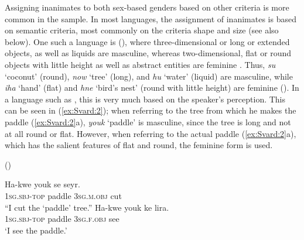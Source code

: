 \documentclass[output=collectionpaper]{langsci/langscibook}
\begin{document}
Assigning inanimates to both sex-based genders based on other criteria is more common in the sample. In most languages, the assignment of inanimates is based on semantic criteria, most commonly on the criteria shape and size (see also  below). One such a language is  (), where three-dimensional or long or extended objects, as well as liquids are masculine, whereas two-dimensional, flat or round objects with little height as well as abstract entities are feminine \citep[47]{Lock2011}. Thus, \textit{su} `coconut' (round), \textit{now} `tree' (long), and \textit{hu} `water' (liquid) are masculine, while \textit{iha} `hand' (flat) and \textit{hne} `bird's nest' (round with little height) are feminine (\citealt[48--50]{Lock2011}). In a language such as , this is very much based on the speaker's perception. This can be seen in (\ref{ex:Svard:2}); when referring to the tree from which he makes the paddle (\ref{ex:Svard:2}a), \textit{youk} `paddle' is masculine, since the tree is long and not at all round or flat. However, when referring to the actual paddle (\ref{ex:Svard:2}a), which has the salient features of flat and round, the feminine form is used.


\ea
\label{ex:Svard:2}
 () \citep[50]{Lock2011}\\
\begin{xlist}
\ex
\gll Ha-kwe youk se seyr.\\
     \textsc{1sg.sbj-top} paddle \textsc{3sg.m.obj} cut\\
\glt ``I cut the `paddle' tree.''
\ex
\gll Ha-kwe youk ke lira.\\
     \textsc{1sg.sbj-top} paddle \textsc{3sg.f.obj} see\\
\glt `I see the paddle.'
\end{xlist}
\z
\end{document}
